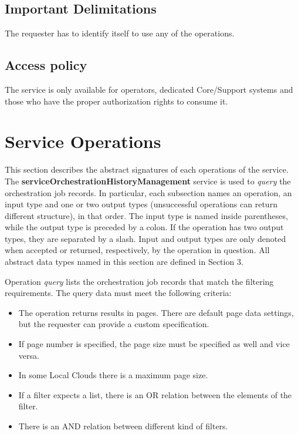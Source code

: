 \documentclass[a4paper]{arrowhead}
\begin{document}
\subsection{Important Delimitations}
\label{sec:delimitations}

The requester has to identify itself to use any of the operations. 

\subsection{Access policy}
\label{sec:accesspolicy}

The service is only available for operators, dedicated Core/Support systems and those who have the proper authorization rights to consume it.

\newpage

\section{Service Operations}
\label{sec:functions}

This section describes the abstract signatures of each operations of the service. The \textbf{serviceOrchestrationHistoryManagement} service is used to \textit{query} the orchestration job records.
In particular, each subsection names an operation, an input type and one or two output types (unsuccessful operations can return different structure), in that order.
The input type is named inside parentheses, while the output type is preceded by a colon. If the operation has two output types, they are separated by a slash.
Input and output types are only denoted when accepted or returned, respectively, by the operation in question. All abstract data types named in this section are defined in Section 3.



Operation \textit{query} lists the orchestration job records that match the filtering requirements. The query data must meet the following criteria:

\begin{itemize}
    \item The operation returns results in pages. There are default page data settings, but the requester can provide a custom specification.
    \item If page number is specified, the page size must be specified as well and vice versa.
    \item In some Local Clouds there is a maximum page size.
    \item If a filter expects a list, there is an OR relation between the elements of the filter.
    \item There is an AND relation between different kind of filters.
\end{itemize}
\end{document}
